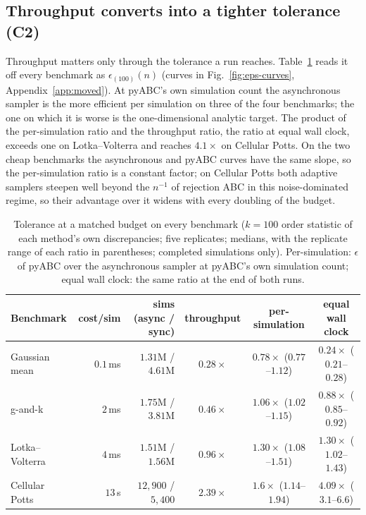 \documentclass[10pt]{article}
\theoremstyle{plain}
\theoremstyle{definition}
\begin{document}
\subsection{Throughput converts into a tighter tolerance (C2)}\label{sec:results-converts}

Throughput matters only through the tolerance a run reaches. Table~\ref{tab:matched-eps} reads it off every benchmark as $\epsilon_{(100)}(n)$ (curves in Fig.~\ref{fig:eps-curves}, Appendix~\ref{app:moved}). At pyABC's own simulation count the asynchronous sampler is the more efficient per simulation on three of the four benchmarks; the one on which it is worse is the one-dimensional analytic target. The product of the per-simulation ratio and the throughput ratio, the ratio at equal wall clock, exceeds one on Lotka--Volterra and reaches $4.1\times$ on Cellular Potts. On the two cheap benchmarks the asynchronous and pyABC curves have the same slope, so the per-simulation ratio is a constant factor; on Cellular Potts both adaptive samplers steepen well beyond the $n^{-1}$ of rejection ABC in this noise-dominated regime, so their advantage over it widens with every doubling of the budget.
\begin{table}[t]
\caption{Tolerance at a matched budget on every benchmark ($k=100$ order statistic of each method's own discrepancies; five replicates; medians, with the replicate range of each ratio in parentheses; completed simulations only). Per-simulation: $\epsilon$ of pyABC over the asynchronous sampler at pyABC's own simulation count; equal wall clock: the same ratio at the end of both runs.}\label{tab:matched-eps}
\centering
\footnotesize
\setlength{\tabcolsep}{4pt}
\begin{tabular}{@{}lrrccc@{}}
\toprule
Benchmark & cost/sim & sims (async / sync) & throughput & per-simulation & equal wall clock \\
\midrule
Gaussian mean   & $0.1$\,ms & $1.31$M / $4.61$M & $0.28\times$ & $0.78\times$ ($0.77$--$1.12$) & $0.24\times$ ($0.21$--$0.28$) \\
g-and-k         & $2$\,ms   & $1.75$M / $3.81$M & $0.46\times$ & $1.06\times$ ($1.02$--$1.15$) & $0.88\times$ ($0.85$--$0.92$) \\
Lotka--Volterra & $4$\,ms   & $1.51$M / $1.56$M & $0.96\times$ & $1.30\times$ ($1.08$--$1.51$) & $1.30\times$ ($1.02$--$1.43$) \\
Cellular Potts  & $13$\,s   & $12{,}900$ / $5{,}400$ & $2.39\times$ & $1.6\times$ ($1.14$--$1.94$) & $4.09\times$ ($3.1$--$6.6$) \\
\bottomrule
\end{tabular}
\end{table}
\end{document}
